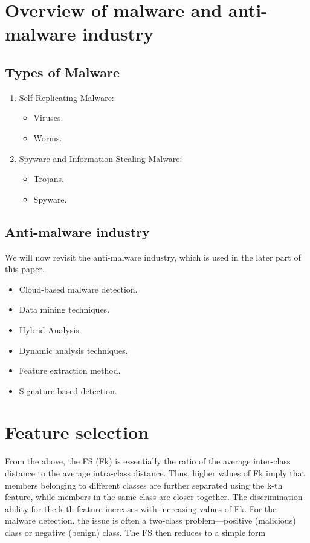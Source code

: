 \documentclass[a4paper, 12pt, oneside]{Thesis}
\begin{document}
\chapter{Overview of malware and anti-malware industry} 
\label{Overview of malware and anti-malware industry}
\section{Types of Malware}
\begin{enumerate}
    \item Self-Replicating Malware:
    \begin{itemize}
        \item Viruses.
        \item Worms.
    \end{itemize}
    
    \item Spyware and Information Stealing Malware:
    \begin{itemize}
        \item Trojans.
        \item Spyware.
    \end{itemize}
\end{enumerate}
\section{Anti-malware industry}
We will now revisit the anti-malware industry, which is used in the
later part of this paper.

\begin{itemize}
    \item Cloud-based malware detection.
    \item Data mining techniques.
    \item Hybrid Analysis.
    \item Dynamic analysis techniques.
    \item Feature extraction method.
    \item Signature-based detection.
\end{itemize}


\chapter{Feature selection} 
\label{Feature selection}
From the above, the FS (Fk) is essentially the ratio of the average inter-class distance to the average intra-class distance. Thus, higher values of Fk imply that members belonging to different classes are further separated using the k-th feature, while members in the same class are closer together. The discrimination ability for the k-th feature increases with increasing values of Fk. For the malware detection, the issue is often a two-class problem—positive (malicious) class or negative (benign) class. The FS then reduces to a simple form
\end{document}
